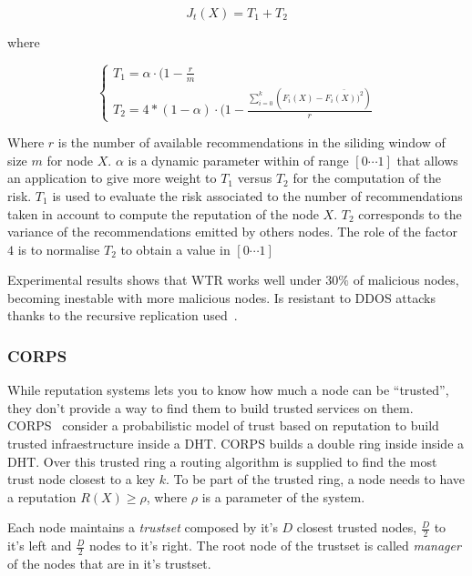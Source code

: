 \begin{equation}
  J_t(X) =  T_1 + T_2
\end{equation}

where

\begin{equation}
  \left\{
  \begin{array}{l}
    T_1 = \alpha \cdot (1-\frac{r}{m}\\
    T_2 = 4 * (1- \alpha) \cdot (1-\frac{\sum_{i=0}^{k} (F_i(X)-\bar{F_i(X))^2})}{r}
  \end{array}\right.
\end{equation}

Where $r$ is the number of available recommendations in the siliding window of
size $m$ for node $X$. $\alpha$ is a dynamic parameter within of range
$[0\cdots 1]$ that allows an application to give more weight to $T_1$ versus
$T_2$ for the computation of the risk. $T_1$ is used to evaluate the risk
associated to the number of recommendations taken in account to compute the
reputation of the node $X$. $T_2$ corresponds to the variance of the
recommendations emitted by others nodes. The role of the factor $4$ is to
normalise $T_2$ to obtain a value in $[0\cdots 1]$

Experimental results shows that WTR works well under $30\%$ of malicious nodes,
becoming inestable with more malicious nodes. Is resistant to DDOS attacks
thanks to the recursive replication used~\cite{recursive_replication}.

\subsubsection{CORPS}
\label{sec:corps}
While reputation systems lets you to know how much a node can be
``trusted'', they don't provide a way to find them to build trusted services on
them. CORPS~\cite{corps} consider a probabilistic model of trust based on
reputation to build trusted infraestructure inside a DHT. CORPS builds a double
ring inside inside a DHT. Over this trusted ring a routing algorithm is supplied to
find the most trust node closest to a key $k$.
To be part of the trusted ring, a node needs to have a reputation $R(X) \ge
\rho$, where $\rho$ is a parameter of the system. 

Each node maintains a \textit{trustset} composed by it's $D$ closest trusted
nodes, $\frac{D}{2}$ to it's left and $\frac{D}{2}$ nodes to it's right.
The root node of the trustset is called \textit{manager} of the nodes that are
in it's trustset.

